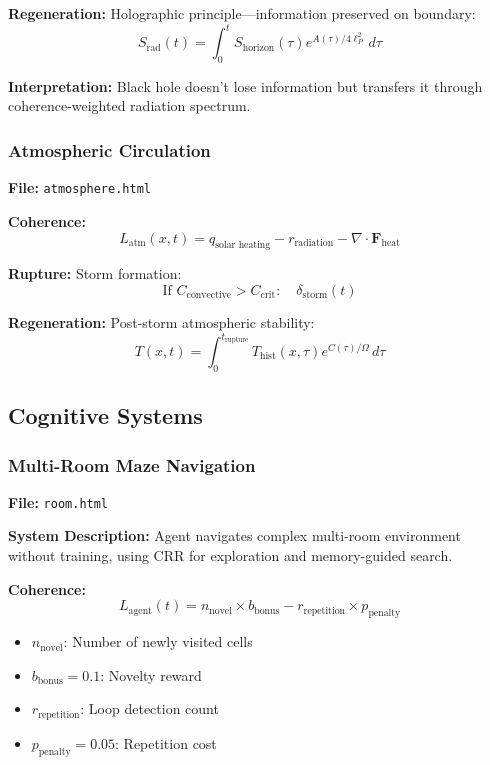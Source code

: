 \documentclass[11pt,a4paper]{article}
\theoremstyle{definition}
\theoremstyle{remark}
\begin{document}
\textbf{Regeneration:} Holographic principle—information preserved on boundary:
\begin{equation}
S_{\text{rad}}(t) = \int_0^t S_{\text{horizon}}(\tau) e^{A(\tau)/4\ell_P^2}\,d\tau
\end{equation}

\textbf{Interpretation:} Black hole doesn't lose information but transfers it through coherence-weighted radiation spectrum.

\subsubsection{Atmospheric Circulation}

\textbf{File:} \texttt{atmosphere.html}

\textbf{Coherence:}
\begin{equation}
L_{\text{atm}}(x,t) = q_{\text{solar heating}} - r_{\text{radiation}} - \nabla \cdot \mathbf{F}_{\text{heat}}
\end{equation}

\textbf{Rupture:} Storm formation:
\begin{equation}
\text{If } C_{\text{convective}} > C_{\text{crit}}: \quad \delta_{\text{storm}}(t)
\end{equation}

\textbf{Regeneration:} Post-storm atmospheric stability:
\begin{equation}
T(x,t) = \int_0^{t_{\text{rupture}}} T_{\text{hist}}(x,\tau) e^{C(\tau)/\Omega}\,d\tau
\end{equation}

\subsection{Cognitive Systems}

\subsubsection{Multi-Room Maze Navigation}

\textbf{File:} \texttt{room.html}

\textbf{System Description:} Agent navigates complex multi-room environment without training, using CRR for exploration and memory-guided search.

\textbf{Coherence:}
\begin{equation}
L_{\text{agent}}(t) = n_{\text{novel}} \times b_{\text{bonus}} - r_{\text{repetition}} \times p_{\text{penalty}}
\end{equation}
\begin{itemize}
\item $n_{\text{novel}}$: Number of newly visited cells
\item $b_{\text{bonus}} = 0.1$: Novelty reward
\item $r_{\text{repetition}}$: Loop detection count
\item $p_{\text{penalty}} = 0.05$: Repetition cost
\end{itemize}
\end{document}
